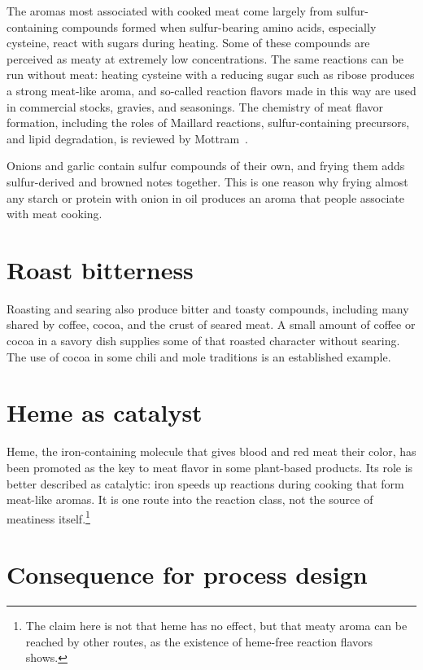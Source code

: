 \documentclass[11pt,openany]{book}
\theoremstyle{definition}
\begin{document}
The aromas most associated with cooked meat come largely from sulfur-containing compounds formed when sulfur-bearing amino acids, especially cysteine, react with sugars during heating. Some of these compounds are perceived as meaty at extremely low concentrations. The same reactions can be run without meat: heating cysteine with a reducing sugar such as ribose produces a strong meat-like aroma, and so-called reaction flavors made in this way are used in commercial stocks, gravies, and seasonings. The chemistry of meat flavor formation, including the roles of Maillard reactions, sulfur-containing precursors, and lipid degradation, is reviewed by Mottram~\cite{mottram1998}.

Onions and garlic contain sulfur compounds of their own, and frying them adds sulfur-derived and browned notes together. This is one reason why frying almost any starch or protein with onion in oil produces an aroma that people associate with meat cooking.

\section{Roast bitterness}

Roasting and searing also produce bitter and toasty compounds, including many shared by coffee, cocoa, and the crust of seared meat. A small amount of coffee or cocoa in a savory dish supplies some of that roasted character without searing. The use of cocoa in some chili and mole traditions is an established example.

\section{Heme as catalyst}

Heme, the iron-containing molecule that gives blood and red meat their color, has been promoted as the key to meat flavor in some plant-based products. Its role is better described as catalytic: iron speeds up reactions during cooking that form meat-like aromas. It is one route into the reaction class, not the source of meatiness itself.\footnote{The claim here is not that heme has no effect, but that meaty aroma can be reached by other routes, as the existence of heme-free reaction flavors shows.}

\section{Consequence for process design}
\end{document}
